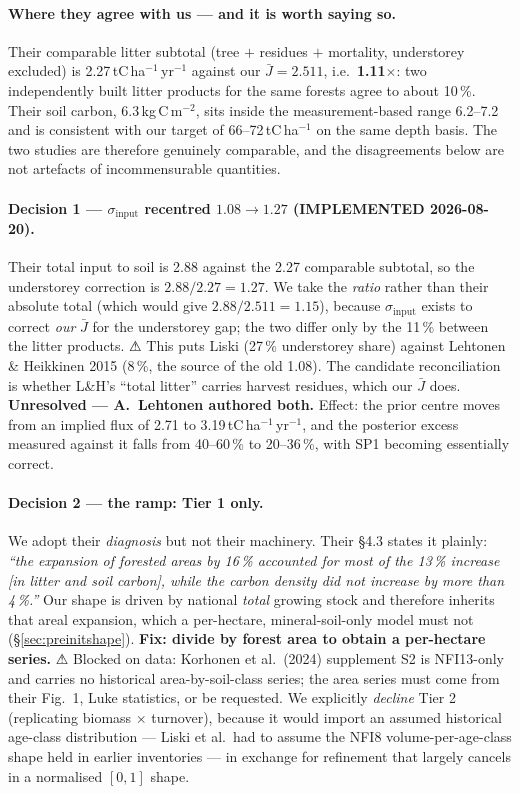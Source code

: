 \documentclass[11pt]{article}
\newcommand{\sinput}{\sigma_{\mathrm{input}}}
\begin{document}
\paragraph{Where they agree with us --- and it is worth saying so.} Their comparable litter subtotal
(tree $+$ residues $+$ mortality, understorey excluded) is 2.27\,tC\,ha$^{-1}$\,yr$^{-1}$ against our
$\bar J = 2.511$, i.e.\ \textbf{1.11$\times$}: two independently built litter products for the same
forests agree to about 10\,\%. Their soil carbon, 6.3\,kg\,C\,m$^{-2}$, sits inside the
measurement-based range 6.2--7.2 and is consistent with our target of 66--72\,tC\,ha$^{-1}$ on the
same depth basis. The two studies are therefore genuinely comparable, and the disagreements below
are not artefacts of incommensurable quantities.

\paragraph{Decision 1 --- $\sinput$ recentred $1.08 \to 1.27$ (IMPLEMENTED 2026-08-20).}
Their total input to soil is 2.88 against the 2.27 comparable subtotal, so the understorey correction
is $2.88/2.27 = 1.27$. We take the \emph{ratio} rather than their absolute total (which would give
$2.88/2.511 = 1.15$), because $\sinput$ exists to correct \emph{our} $\bar J$ for the understorey gap;
the two differ only by the 11\,\% between the litter products.
⚠ This puts Liski (27\,\% understorey share) against Lehtonen \& Heikkinen 2015 (8\,\%, the source of
the old 1.08). The candidate reconciliation is whether L\&H's ``total litter'' carries harvest
residues, which our $\bar J$ does. \textbf{Unresolved --- A.\ Lehtonen authored both.} Effect: the
prior centre moves from an implied flux of 2.71 to 3.19\,tC\,ha$^{-1}$\,yr$^{-1}$, and the posterior
excess measured against it falls from 40--60\,\% to 20--36\,\%, with SP1 becoming essentially correct.

\paragraph{Decision 2 --- the ramp: Tier 1 only.} We adopt their \emph{diagnosis} but not their
machinery. Their §4.3 states it plainly: \emph{``the expansion of forested areas by 16\,\% accounted
for most of the 13\,\% increase [in litter and soil carbon], while the carbon density did not increase
by more than 4\,\%.''} Our shape is driven by national \emph{total} growing stock and therefore
inherits that areal expansion, which a per-hectare, mineral-soil-only model must not
(\S\ref{sec:preinitshape}). \textbf{Fix: divide by forest area to obtain a per-hectare series.}
⚠ Blocked on data: Korhonen et al.\ (2024) supplement S2 is NFI13-only and carries no historical
area-by-soil-class series; the area series must come from their Fig.~1, Luke statistics, or be
requested. We explicitly \emph{decline} Tier 2 (replicating biomass $\times$ turnover), because it
would import an assumed historical age-class distribution --- Liski et al.\ had to assume the NFI8
volume-per-age-class shape held in earlier inventories --- in exchange for refinement that largely
cancels in a normalised $[0,1]$ shape.
\end{document}
